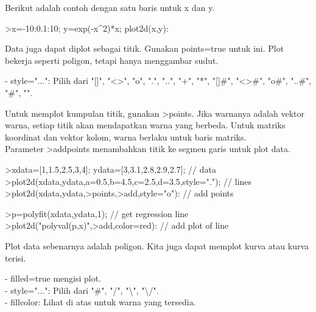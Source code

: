 \documentclass[a4paper,10pt]{article}
\begin{document}
\begin{eulernotebook}
\begin{eulercomment}
\begin{eulercomment}
\begin{eulercomment}
\begin{eulercomment}
\begin{eulercomment}
\begin{eulercomment}
\begin{eulercomment}
\begin{eulercomment}
\begin{eulercomment}
\begin{eulercomment}
\begin{eulercomment}
Berikut adalah contoh dengan satu baris untuk x dan y.

\end{eulercomment}
\begin{eulerprompt}
>x=-10:0.1:10; y=exp(-x^2)*x; plot2d(x,y):
\end{eulerprompt}
\begin{eulercomment}
Data juga dapat diplot sebagai titik. Gunakan points=true untuk ini.
Plot bekerja seperti poligon, tetapi hanya menggambar sudut.

- style="...": Pilih dari "[]", "\textless{}\textgreater{}", "o", ".", "..", "+", "*", "[]#",
"\textless{}\textgreater{}#", "o#", "..#", "#", "\textbar{}".

Untuk memplot kumpulan titik, gunakan \textgreater{}points. Jika warnanya adalah
vektor warna, setiap titik akan mendapatkan warna yang berbeda. Untuk
matriks koordinat dan vektor kolom, warna berlaku untuk baris matriks.\\
Parameter \textgreater{}addpoints menambahkan titik ke segmen garis untuk plot
data.
\end{eulercomment}
\begin{eulerprompt}
>xdata=[1,1.5,2.5,3,4]; ydata=[3,3.1,2.8,2.9,2.7]; // data
>plot2d(xdata,ydata,a=0.5,b=4.5,c=2.5,d=3.5,style="."); // lines
>plot2d(xdata,ydata,>points,>add,style="o"): // add points
\end{eulerprompt}
\begin{eulerprompt}
>p=polyfit(xdata,ydata,1); // get regression line
>plot2d("polyval(p,x)",>add,color=red): // add plot of line
\end{eulerprompt}
\begin{eulercomment}
Plot data sebenarnya adalah poligon. Kita juga dapat memplot kurva
atau kurva terisi.

- filled=true mengisi plot.\\
- style="...": Pilih dari "#", "/", "\textbackslash{}", "\textbackslash{}/".\\
- fillcolor: Lihat di atas untuk warna yang tersedia.


\end{eulercomment}
\end{eulercomment}
\end{eulercomment}
\end{eulercomment}
\end{eulercomment}
\end{eulercomment}
\end{eulercomment}
\end{eulercomment}
\end{eulercomment}
\end{eulercomment}
\end{eulercomment}
\end{eulernotebook}
\end{document}
